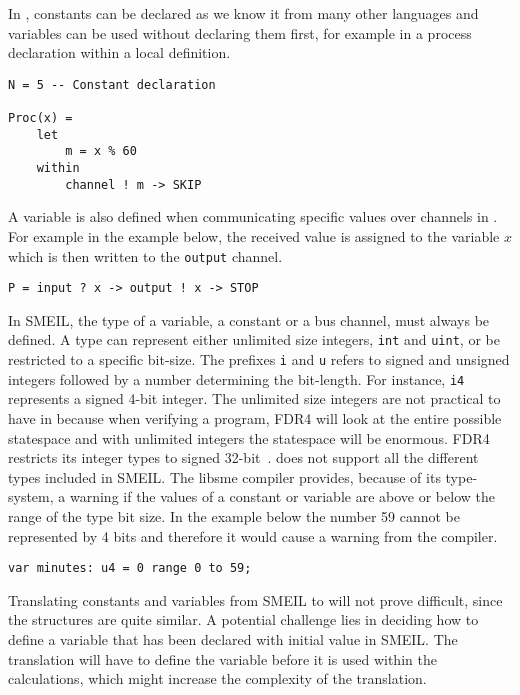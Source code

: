 In \cspm, constants can be declared as we know it from many other languages and variables can be used without declaring them first, for example in a process declaration within a local definition.
\begin{verbatim}
N = 5 -- Constant declaration

Proc(x) =
    let
        m = x % 60
    within
        channel ! m -> SKIP
\end{verbatim}
A variable is also defined when communicating specific values over channels in \cspm. For example in the example below, the received value is assigned to the variable $x$ which is then written to the \texttt{output} channel.
\begin{verbatim}
P = input ? x -> output ! x -> STOP
\end{verbatim}

In SMEIL, the type of a variable, a constant or a bus channel, must always be defined. A type can represent either unlimited size integers, \texttt{int} and \texttt{uint}, or be restricted to a specific bit-size. The prefixes \texttt{i} and \texttt{u} refers to signed and unsigned integers followed by a number determining the bit-length. For instance, \texttt{i4} represents a signed 4-bit integer. The unlimited size integers are not practical to have in \cspm{} because when verifying a program, FDR4 will look at the entire possible statespace and with unlimited integers the statespace will be enormous. FDR4 restricts its integer types to signed 32-bit~\cite{UniversityofOxford}. \cspm{} does not support all the different types included in SMEIL. The libsme compiler provides, because of its type-system, a warning if the values of a constant or variable are above or below the range of the type bit size. In the example below the number 59 cannot be represented by 4 bits and therefore it would cause a warning from the compiler.\\
\begin{verbatim}
var minutes: u4 = 0 range 0 to 59;
\end{verbatim}

Translating constants and variables from SMEIL to \cspm will not prove difficult, since the structures are quite similar.
A potential challenge lies in deciding how to define a variable that has been declared with initial value in SMEIL. The \cspm translation will have to define the variable before it is used within the calculations, which might increase the complexity of the translation.\\

